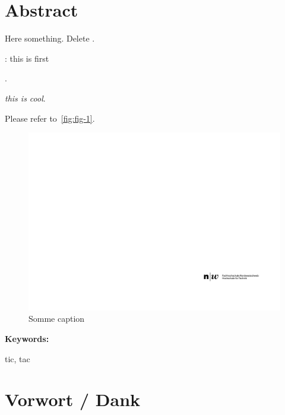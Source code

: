 \section*{Abstract}

Here  something.
Delete .

\eg \etc \ie \etal

: this is first

.

\emph{this is cool}.

Please refer to~\autoref{fig:fig-1}.

\begin{figure}[]
\centering
\includegraphics[]{graphics/fhnw_ht_logo_de.pdf}
\caption{Somme caption}
\label{fig:fig-1}
\end{figure}




\vspace{2ex}

\textbf{Keywords:}

tic, tac

\clearpage

\section*{Vorwort / Dank}


